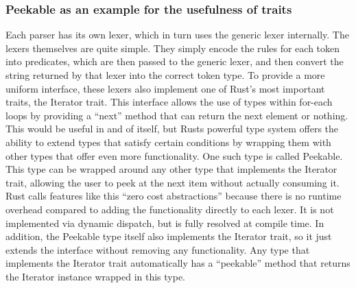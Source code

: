 \subsubsection{Peekable as an example for the usefulness of traits}
Each parser has its own lexer, which in turn uses the generic lexer internally.
The lexers themselves are quite simple. They simply encode the rules for each token into predicates, which are then passed to the generic lexer, and then convert the string returned by that lexer into the correct token type.
To provide a more uniform interface, these lexers also implement one of Rust's most important traits, the Iterator trait.
This interface allows the use of types within for-each loops by providing a ``next'' method that can return the next element or nothing.
This would be useful in and of itself, but Rusts powerful type system offers the ability to extend types that satisfy certain conditions by wrapping them with other types that offer even more functionality.
One such type is called Peekable. This type can be wrapped around any other type that implements the Iterator trait, allowing the user to peek at the next item without actually consuming it.
Rust calls features like this ``zero cost abstractions'' because there is no runtime overhead compared to adding the functionality directly to each lexer. It is not implemented via dynamic dispatch, but is fully resolved at compile time.
In addition, the Peekable type itself also implements the Iterator trait, so it just extends the interface without removing any functionality.
Any type that implements the Iterator trait automatically has a ``peekable'' method that returns the Iterator instance wrapped in this type.

